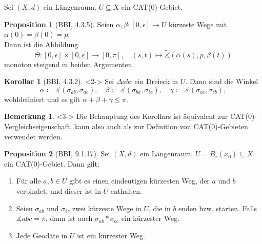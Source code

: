 \documentclass{beamer}
\theoremstyle{definition}
\newtheorem*{bem}{Bemerkung}
\newtheorem*{kor}{Korollar}
\newtheorem*{prop}{Proposition}
\begin{document}
\begin{frame}
  Sei $(X, d)$ ein Längenraum, $U \subseteq X$ ein CAT($0$)-Gebiet.

  \begin{prop}[BBI, 4.3.5]
    Seien $\alpha, \beta : \left[0,\epsilon\right] \to U$ kürzeste Wege mit $\alpha(0) = \beta(0) = p$.\\
    Dann ist die Abbildung
    \[ \Theta : \left[0,\epsilon\right] \times \left[0,\epsilon\right] \to \left[ 0, \pi \right], \quad (s, t) \mapsto \widetilde{\measuredangle}(\alpha(s),p,\beta(t)) \]
    monoton steigend in beiden Argumenten.
  \end{prop}

  \begin{kor}[BBI, 4.3.2]<2->
    Sei $\Delta abc$ ein Dreieck in $U$. Dann sind die Winkel
    \[
      \alpha \coloneqq \measuredangle (\sigma_{ab}, \sigma_{ac}),
      \quad
      \beta \coloneqq \measuredangle (\sigma_{ba}, \sigma_{bc}),
      \quad
      \gamma \coloneqq \measuredangle (\sigma_{ca}, \sigma_{cb}),
    \]
    wohldefiniert und es gilt $\alpha + \beta + \gamma \leq \pi$.
  \end{kor}

  \begin{bem}<3->
    Die Behauptung des Korollars ist äquivalent zur CAT($0$)-Vergleichseigenschaft, kann also auch als zur Definition von CAT($0$)-Gebieten verwendet werden.
  \end{bem}
\end{frame}

\begin{frame}
  \begin{prop}[BBI, 9.1.17]
    Sei $(X, d)$ ein Längenraum, $U = B_r(x_0) \subseteq X$ ein CAT($0$)-Gebiet. Dann gilt:
    \begin{enumerate}
      \item Für alle $a, b \in U$ gibt es einen eindeutigen kürzesten Weg, der $a$ und $b$ verbindet, und dieser ist in $U$ enthalten.
      \item Seien $\sigma_{ab}$ und $\sigma_{bc}$ zwei kürzeste Wege in $U$, die in $b$ enden bzw. starten. Falls $\measuredangle abc = \pi$, dann ist auch $\sigma_{ab} * \sigma_{bc}$ ein kürzester Weg.
      \item Jede Geodäte in $U$ ist ein kürzester Weg.
    \end{enumerate}
  \end{prop}
\end{frame}
\end{document}
